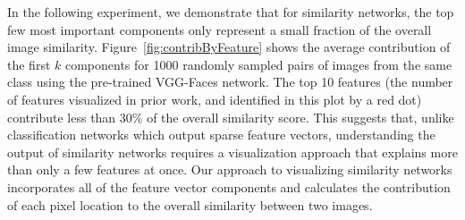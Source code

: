 In the following experiment, we demonstrate that for similarity networks, the top few most important components only represent a small fraction of the overall image similarity.  Figure~\ref{fig:contribByFeature} shows the average contribution of the first $k$ components for 1000 randomly sampled pairs of images from the same class using the pre-trained VGG-Faces network. The top 10 features (the number of features visualized in prior work, and identified in this plot by a red dot) contribute less than 30\% of the overall similarity score. This suggests that, unlike classification networks which output sparse feature vectors, understanding the output of similarity networks requires a visualization approach that explains more than only a few features at once. Our approach to visualizing similarity networks incorporates all of the feature vector components and calculates the contribution of each pixel location to the overall similarity between two images.

